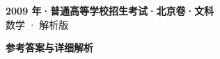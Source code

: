 \documentclass[zihao=-4, a4paper]{ctexart}
\begin{document}
\begin{center}
  {\Large\bfseries 2009 年·普通高等学校招生考试·北京卷·文科}\\[4pt]
  {\large 数学 · 解析版}
\end{center}
\medskip
{}

\clearpage
{}
\begin{center}{\Large\bfseries 参考答案与详细解析}\end{center}
\medskip

\end{document}
